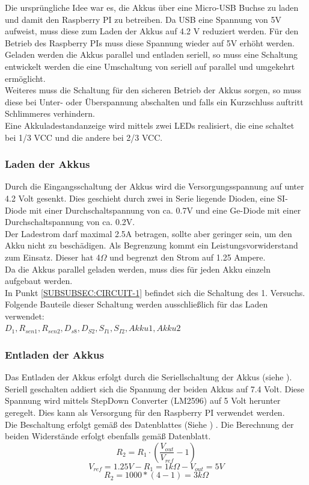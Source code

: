 \documentclass[12pt,a4paper]{article}
\begin{document}
{Die ursprüngliche Idee war es, die Akkus über eine Micro-USB Buchse zu laden und damit den Raspberry PI zu betreiben. Da USB eine Spannung von 5V aufweist, muss diese zum Laden der Akkus auf 4.2 V reduziert werden. Für den Betrieb des Raspberry PIs muss diese Spannung wieder auf 5V erhöht werden. \\
Geladen werden die Akkus parallel und entladen seriell, so muss eine Schaltung entwickelt werden die eine Umschaltung von seriell auf parallel und umgekehrt ermöglicht. \\
Weiteres muss die Schaltung für den sicheren Betrieb der Akkus sorgen, so muss diese bei Unter- oder Überspannung abschalten und falls ein Kurzschluss auftritt Schlimmeres verhindern. \\
Eine Akkuladestandanzeige wird mittels zwei LEDs realisiert, die eine schaltet bei 1/3 VCC und die andere bei 2/3 VCC. 

\subsubsection{Laden der Akkus}
\label{SUBSUBSEC:AKKULOAD1}

Durch die Eingangsschaltung der Akkus wird die Versorgungsspannung auf unter 4.2 Volt gesenkt. Dies geschieht durch zwei in Serie liegende Dioden, eine SI-Diode mit einer Durchschaltspannung von ca. 0.7V und eine Ge-Diode mit einer Durchschaltspannung von ca. 0.2V. \\
Der Ladestrom darf maximal 2.5A betragen, sollte aber geringer sein, um den Akku nicht zu beschädigen. Als Begrenzung kommt ein Leistungsvorwiderstand zum Einsatz. Dieser hat 4$\Omega$ und begrenzt den Strom auf 1.25 Ampere. \\
Da die Akkus parallel geladen werden, muss dies für jeden Akku einzeln aufgebaut werden. \\
In Punkt \ref{SUBSUBSEC:CIRCUIT-1} befindet sich die Schaltung des 1. Versuchs. Folgende Bauteile dieser Schaltung werden ausschließlich für das Laden verwendet:\\
 $D_1,R_{sen1},R_{sen2},D_{s8},D_{S2},S_{I1},S_{I2}, Akku1, Akku2$ \\


\subsubsection{Entladen der Akkus}
\label{SUBSUBSEC:AKKUENTLOAD1}

Das Entladen der Akkus erfolgt durch die Seriellschaltung der Akkus (siehe ). Seriell geschalten addiert sich die Spannung der beiden Akkus auf 7.4 Volt. Diese Spannung wird mittels StepDown Converter (LM2596) auf 5 Volt herunter geregelt.  Dies kann als Versorgung für den Raspberry PI verwendet werden. \\
Die Beschaltung erfolgt gemäß des Datenblattes (Siehe \cite{LM2596}) . Die Berechnung der beiden Widerstände erfolgt ebenfalls gemäß Datenblatt.
\[R_2 = R_1 \cdot \left(\frac{V_{out}}{V_{ref}} - 1 \right)\]
\[V_{ref} = 1.25 V - R_1 = 1 k\Omega - V_{out} = 5V\]
\[R_2 = 1000*(4-1) = 3 k\Omega\]

}
\end{document}
